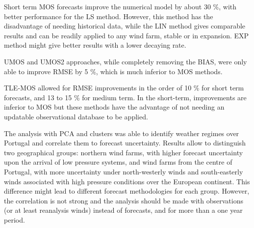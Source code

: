 Short term MOS forecasts improve the numerical model by about 30 \%, with better performance for the LS method. However, this method has the disadvantage of needing historical data, while the LIN method gives comparable results and can be readily applied to any wind farm, stable or in expansion. EXP method might give better results with a lower decaying rate.

UMOS and UMOS2 approaches, while completely removing the BIAS, were only able to improve RMSE by 5 \%, which is much inferior to MOS methods. 

TLE-MOS allowed for RMSE improvements in the order of 10 \% for short term forecasts, and 13 to 15 \% for medium term. In the short-term, improvements are inferior to MOS but these methods have the advantage of not needing an updatable observational database to be applied. 

The analysis with PCA and clusters was able to identify weather regimes over Portugal and correlate them to forecast uncertainty. Results allow to distinguish two geographical groups: northern wind farms, with higher forecast uncertainty upon the arrival of low pressure systems, and wind farms from the centre of Portugal, with more uncertainty under north-westerly winds and south-easterly winds associated with high pressure conditions over the European continent. This difference might lead to different forecast methodologies for each group. However, the correlation is not strong and the analysis should be made with observations (or at least reanalysis winds) instead of forecasts, and for more than a one year period.



